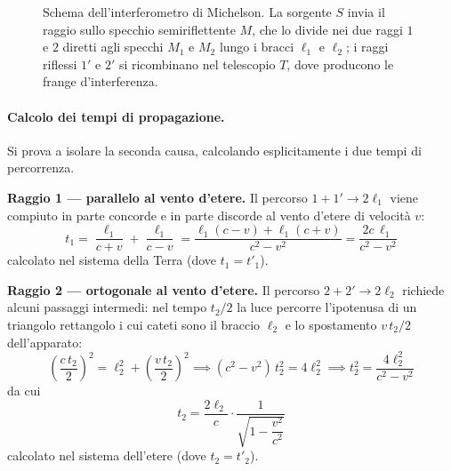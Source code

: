 \begin{figure}[ht]
    \caption{Schema dell'interferometro di Michelson. La sorgente $S$ invia il raggio sullo specchio semiriflettente $M$, che lo divide nei due raggi $1$ e $2$ diretti agli specchi $M_1$ e $M_2$ lungo i bracci $\ell_1$ e $\ell_2$; i raggi riflessi $1'$ e $2'$ si ricombinano nel telescopio $T$, dove producono le frange d'interferenza.}
\end{figure}

\paragraph{Calcolo dei tempi di propagazione.}
Si prova a isolare la seconda causa, calcolando esplicitamente i due tempi di percorrenza.

\textbf{Raggio 1 --- parallelo al vento d'etere.} Il percorso $1 + 1' \to 2\ell_1$ viene compiuto in parte concorde e in parte discorde al vento d'etere di velocità $v$:
\begin{equation}
    t_1 = \frac{\ell_1}{c+v} + \frac{\ell_1}{c-v}
    = \frac{\ell_1(c-v) + \ell_1(c+v)}{c^2 - v^2}
    = \boxed{\frac{2c\,\ell_1}{c^2 - v^2}}
\end{equation}
calcolato nel sistema della Terra (dove $t_1 = t'_1$).

\textbf{Raggio 2 --- ortogonale al vento d'etere.} Il percorso $2 + 2' \to 2\ell_2$ richiede alcuni passaggi intermedi: nel tempo $t_2/2$ la luce percorre l'ipotenusa di un triangolo rettangolo i cui cateti sono il braccio $\ell_2$ e lo spostamento $v\,t_2/2$ dell'apparato:
\begin{equation}
    \left(\frac{c\,t_2}{2}\right)^{\!2} = \ell_2^2 + \left(\frac{v\,t_2}{2}\right)^{\!2}
    \implies (c^2 - v^2)\, t_2^2 = 4\ell_2^2
    \implies t_2^2 = \frac{4\ell_2^2}{c^2 - v^2}
\end{equation}
da cui
\begin{equation}
    t_2 = \boxed{\frac{2\ell_2}{c} \cdot \frac{1}{\sqrt{1 - \dfrac{v^2}{c^2}}}}
\end{equation}
calcolato nel sistema dell'etere (dove $t_2 = t'_2$).


